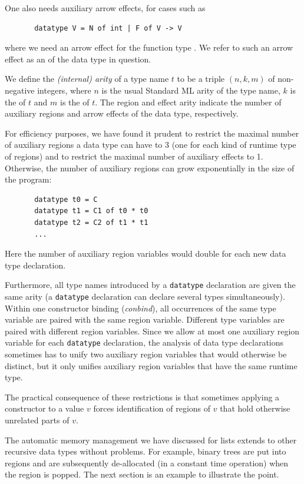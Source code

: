 \documentclass[12pt]{book}
\begin{document}
One also needs auxiliary arrow effects, for cases such as 
\begin{verbatim}
       datatype V = N of int | F of V -> V
\end{verbatim}
where we need an arrow effect for the function type . We refer
to such an arrow effect as an  of the data type in question.

We define the {\em (internal) arity} of a type name $t$ to be a 
triple $(n,k,m)$ of non-negative integers, 
where $n$ is the usual Standard ML arity of the type name,
$k$ is the  of $t$ and $m$ is the  of 
$t$. The region and effect arity indicate the number of auxiliary regions
and arrow effects of the data type, respectively.

For efficiency purposes, we have found it prudent to restrict the maximal number
of auxiliary regions a data type can have to 3 
(one for each kind of runtime type of regions) and
to restrict the maximal number of auxiliary effects to 1.               
Otherwise, the number of auxiliary regions can grow exponentially in the
size of the program:
\begin{verbatim}
       datatype t0 = C
       datatype t1 = C1 of t0 * t0
       datatype t2 = C2 of t1 * t1
       ...
\end{verbatim}
Here the number of auxiliary region variables would double for each new data type
declaration. 

Furthermore, all type names introduced by a {\tt datatype} declaration are
given the same arity (a {\tt datatype} declaration can declare several
types simultaneously). Within one constructor binding ({\it conbind\/}), all
occurrences of the same type variable are paired with the same region variable. 
Different type variables are paired with different region variables.
Since we allow at most one auxiliary region variable for each {\tt datatype}
declaration, the analysis of data type declarations sometimes has to unify
two auxiliary region variables that would otherwise be distinct, but it only unifies auxiliary region
variables that have the same runtime type. 

The practical consequence of these restrictions is that sometimes
applying a constructor to a value $v$ forces identification of regions
of $v$ that hold otherwise unrelated parts of $v$.


The automatic memory management we have discussed for lists extends to
other recursive data types without problems. For example, binary trees
are put into regions and are subsequently de-allocated (in a constant time operation) when
the region is popped. The next section is an example 
to illustrate the point.
\end{document}

